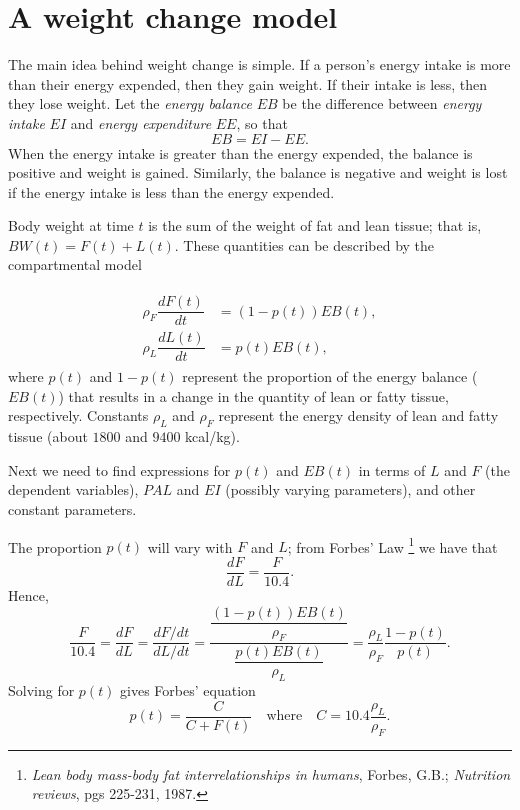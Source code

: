 \section*{A weight change model}
The main idea behind weight change is simple.
If a person's energy intake is more than their energy expended, then they gain weight.
If their intake is less, then they lose weight.
Let the \emph{energy balance} $EB$ be the difference between \emph{energy intake} $EI$ and \emph{energy expenditure} $EE$, so that
\begin{equation}
\label{eqn:EB}
EB = EI - EE.
\end{equation}
When the energy intake is greater than the energy expended, the balance is positive and weight is gained.
Similarly, the balance is negative and weight is lost if the energy intake is less than the energy expended.

Body weight at time $t$ is the sum of the weight of fat and lean tissue; that is,  $BW(t) = F(t) + L(t).$
These quantities can be described by the compartmental model



\begin{align}
	\begin{split}
		\rho_F \dfrac{dF(t)}{dt} &= (1-p(t)) EB(t),\\
		\rho_L \dfrac{dL(t)}{dt} &= p(t) EB(t),
	\end{split}\label{eqn:compartment}
\end{align}
where $p(t)$ and $1-p(t)$ represent the proportion of the energy balance ($EB(t)$) that results in a change in the quantity of lean or fatty tissue, respectively.
Constants $\rho_L$ and $\rho_F$ represent the energy density of lean and fatty tissue (about $1800$ and $9400$ kcal/kg).

Next we need to find expressions for $p(t)$ and $EB(t)$ in terms of $L$ and $F$ (the dependent variables), $PAL$ and $EI$ (possibly varying parameters), and other constant parameters.

 The proportion $p(t)$ will vary with $F$ and $L$; from Forbes' Law 
 \footnote{\emph{Lean body mass-body fat interrelationships in humans}, Forbes, G.B.; \emph{ Nutrition reviews}, pgs 225-231, 1987.}
 we have that
\begin{equation}
\label{eqn:forbes}
\dfrac{dF}{dL} = \dfrac{F}{10.4}.
\end{equation}
Hence,
\[
\dfrac{F}{10.4} = \dfrac{dF}{dL} = \dfrac{dF/dt}{dL/dt} = \dfrac{\dfrac{(1-p(t)) EB(t)}{\rho_F}}{\dfrac{p(t) EB(t)}{\rho_L}} = \dfrac{\rho_L}{\rho_F} \dfrac{1-p(t)}{p(t)}.
\]
Solving for $p(t)$ gives Forbes' equation
\begin{equation}
\label{eqn:Forbes2}
p(t) = \dfrac{C}{C+F(t)}\quad\mbox{where}\quad C=10.4\dfrac{\rho_L}{\rho_F}.
\end{equation}

